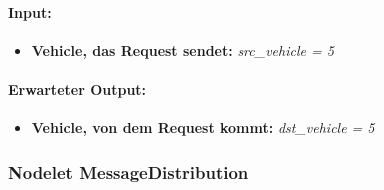 \documentclass[a4paper, 12pt, titlepage]{scrartcl}
\begin{document}
			\paragraph{Input:}
			\begin{itemize} \itemsep-0.5em
				\item \textbf{Vehicle, das Request sendet:} \emph{src\_vehicle = 5}
			\end{itemize}
			\paragraph{Erwarteter Output:}
			\begin{itemize} \itemsep-0.5em
				\item \textbf{Vehicle, von dem Request kommt:} \emph{dst\_vehicle = 5}
			\end{itemize} 			

			\subsubsection{Nodelet MessageDistribution}
			\label{node_message_distribution}
\end{document}
